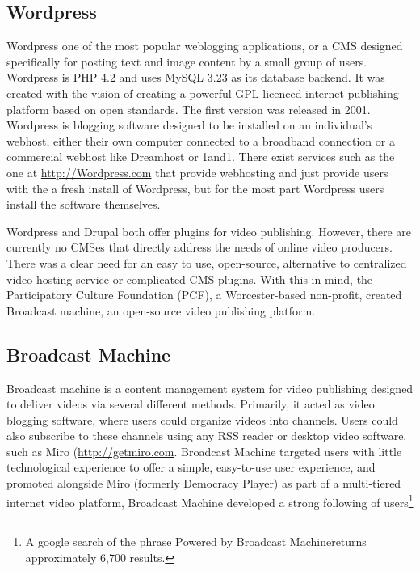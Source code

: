 \documentclass[a4paper,12pt]{report}
\begin{document}
\subsection{Wordpress}
Wordpress one of the most popular weblogging applications, or a CMS designed specifically for posting text and image content by a small group of users.
Wordpress is PHP 4.2 and uses MySQL 3.23 as its database backend. 
It was created with the vision of creating a powerful GPL-licenced internet publishing platform based on open standards. 
The first version was released in 2001. 
Wordpress is blogging software designed to be installed on an individual's webhost, either their own computer connected to a broadband connection or a commercial webhost like Dreamhost or 1and1. There exist services such as the one at \url{http://Wordpress.com} that provide webhosting and just provide users with the a fresh install of Wordpress, but for the most part Wordpress users install the software themselves. 

Wordpress and Drupal both offer plugins for video publishing. However, there are currently no CMSes that directly address the needs of online video producers. There was a clear need for an easy to use, open-source, alternative to centralized video hosting service or complicated CMS plugins. With this in mind, the Participatory Culture Foundation (PCF), a Worcester-based non-profit, created Broadcast machine, an open-source video publishing platform.

\subsection {Broadcast Machine}
Broadcast machine is a content management system for video publishing designed to deliver videos via several different methods. Primarily, it acted as video blogging software, where users could organize videos into channels. Users could also subscribe to these channels using any RSS reader or desktop video software, such as Miro (\url{http://getmiro.com}. Broadcast Machine targeted users with little technological experience to offer a simple, easy-to-use user experience, and promoted alongside Miro (formerly Democracy Player) as part of a multi-tiered internet video platform, Broadcast Machine developed a strong following of users\footnote{A google search of the phrase \"Powered by Broadcast Machine\" returns approximately 6,700 results.}
\end{document}
